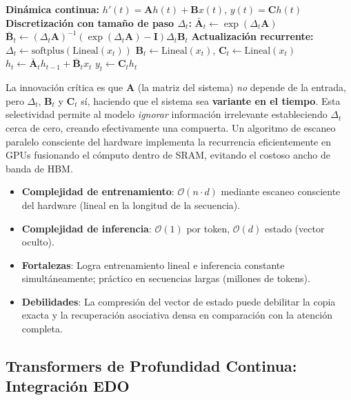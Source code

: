 \begin{algorithmic}[1]
\State \textbf{Dinámica continua:} $h'(t) = \mathbf{A} h(t) + \mathbf{B} x(t)$, \quad $y(t) = \mathbf{C} h(t)$
\State \textbf{Discretización con tamaño de paso $\Delta_t$:}
\State $\bar{\mathbf{A}}_t \gets \exp(\Delta_t \mathbf{A})$
\State $\bar{\mathbf{B}}_t \gets (\Delta_t \mathbf{A})^{-1} (\exp(\Delta_t \mathbf{A}) - \mathbf{I}) \Delta_t \mathbf{B}_t$
\State \textbf{Actualización recurrente:}
    \State $\Delta_t \gets \text{softplus}(\text{Lineal}(x_t))$ 
    \State $\mathbf{B}_t \gets \text{Lineal}(x_t)$, \quad $\mathbf{C}_t \gets \text{Lineal}(x_t)$ 
    \State $h_t \gets \bar{\mathbf{A}}_t h_{t-1} + \bar{\mathbf{B}}_t x_t$ 
    \State $y_t \gets \mathbf{C}_t h_t$ 
\EndFor
\end{algorithmic}

La innovación crítica es que $\mathbf{A}$ (la matriz del sistema) \textit{no} depende de la entrada, pero $\Delta_t$, $\mathbf{B}_t$ y $\mathbf{C}_t$ sí, haciendo que el sistema sea \textbf{variante en el tiempo}. Esta selectividad permite al modelo \textit{ignorar} información irrelevante estableciendo $\Delta_t$ cerca de cero, creando efectivamente una compuerta. Un algoritmo de escaneo paralelo consciente del hardware implementa la recurrencia eficientemente en GPUs fusionando el cómputo dentro de SRAM, evitando el costoso ancho de banda de HBM.

\begin{itemize}[leftmargin=*]
    \item \textbf{Complejidad de entrenamiento}: $\mathcal{O}(n \cdot d)$ mediante escaneo consciente del hardware (lineal en la longitud de la secuencia).
    \item \textbf{Complejidad de inferencia}: $\mathcal{O}(1)$ por token, $\mathcal{O}(d)$ estado (vector oculto).
    \item \textbf{Fortalezas}: Logra entrenamiento lineal e inferencia constante simultáneamente; práctico en secuencias largas (millones de tokens).
    \item \textbf{Debilidades}: La compresión del vector de estado puede debilitar la copia exacta y la recuperación asociativa densa en comparación con la atención completa.
\end{itemize}

\subsection{Transformers de Profundidad Continua: Integración EDO}

